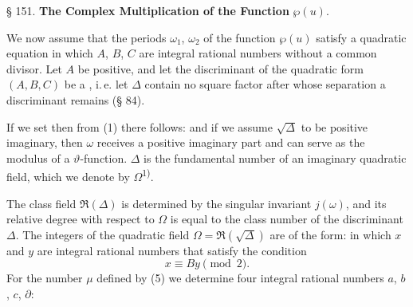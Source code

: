 
\begin{center}
§ 151. \textbf{The Complex Multiplication of the Function} $\wp(u)$.
\end{center}

We now assume that the periods $\omega_1$, $\omega_2$ of the function $\wp(u)$ satisfy a quadratic equation
in which $A$, $B$, $C$ are integral rational numbers without a common divisor. Let $A$ be positive, and let the discriminant of the quadratic form $(A, B, C)$
be a , i.\,e. let $\Delta$ contain no square factor after whose separation a discriminant remains (§ 84).

If we set
then from (1) there follows:
and if we assume $\sqrt{\Delta}$ to be positive imaginary, then $\omega$ receives a positive imaginary part and can serve as the modulus of a $\vartheta$-function. $\Delta$ is the fundamental number of an imaginary quadratic field, which we denote by $\Omega$\textsuperscript{1)}\begingroup\renewcommand{\thefootnote}{1)}\endgroup.

The class field $\mathfrak{R}(\Delta)$ is determined by the singular invariant $j(\omega)$, and its relative degree with respect to $\Omega$ is equal to the class number of the discriminant $\Delta$. The integers of the quadratic field $\Omega = \mathfrak{R}(\sqrt{\Delta})$ are of the form:
in which $x$ and $y$ are integral rational numbers that satisfy the condition
\[ x \equiv By \pmod{2}. \]
For the number $\mu$ defined by (5) we determine four integral rational numbers $a$, $b$, $c$, $\partial$:
